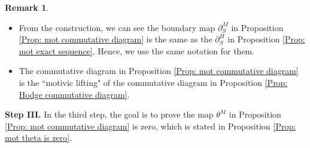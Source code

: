 \documentclass[11pt, a4paper]{amsart}
\theoremstyle{plain}
\theoremstyle{definition}
\newtheorem{remark}[theorem]{Remark}
\numberwithin{equation}{section}
\begin{document}
\begin{remark}
    \begin{itemize}
        \item  From the construction, we can see the boundary map $\partial_{S}^{M}$ in Proposition \ref{Prop: mot commutative diagram} is the same as the $\partial_{S}^{H}$ in Proposition \ref{Prop: mot exact sequence}. Hence, we use the same notation for them. 
        \item  The commutative diagram in Proposition \ref{Prop: mot commutative diagram} is the ``motivic lifting" of the commutative diagram in Proposition \ref{Prop: Hodge commutative diagram}. 
    \end{itemize}
\end{remark}

\vspace{10pt}

\noindent \textbf{Step III.} In the third step, the goal is to prove the map $\theta^{M}$ in Proposition \ref{Prop: mot commutative diagram} is zero, which is stated in Proposition \ref{Prop: mot theta is zero}. \\
\end{document}
